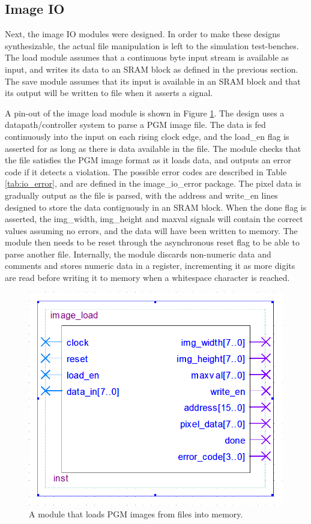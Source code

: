 \documentclass[a4paper, 10pt, titlepage]{article}
\begin{document}
\subsection{Image IO}

Next, the image IO modules were designed. In order to make these designs synthesizable, the actual file manipulation is left to the simulation test-benches. The load module assumes that a continuous byte input stream is available as input, and writes its data to an SRAM block as defined in the previous section. The save module assumes that its input is available in an SRAM block and that its output will be written to file when it asserts a signal.

A pin-out of the image load module is shown in Figure \ref{fig:image_load}. The design uses a datapath/controller system to parse a PGM image file. The data is fed continuously into the input on each rising clock edge, and the load\_en flag is asserted for as long as there is data available in the file. The module checks that the file satisfies the PGM image format as it loads data, and outputs an error code if it detects a violation. The possible error codes are described in Table \ref{tab:io_error}, and are defined in the image\_io\_error package. The pixel data is gradually output as the file is parsed, with the address and write\_en lines designed to store the data contiguously in an SRAM block. When the done flag is asserted, the img\_width, img\_height and maxval signals will contain the correct values assuming no errors, and the data will have been written to memory. The module then needs to be reset through the asynchronous reset flag to be able to parse another file. Internally, the module discards non-numeric data and comments and stores numeric data in a register, incrementing it as more digits are read before writing it to memory when a whitespace character is reached.

\begin{figure}
    \centering
    \includegraphics[width=0.5\linewidth]{image_load_entity.PNG}
    \caption{A module that loads PGM images from files into memory.}
    \label{fig:image_load}
\end{figure}
\end{document}
